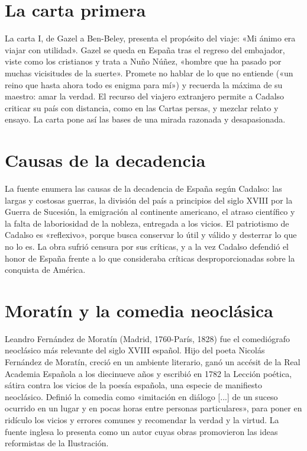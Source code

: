 \documentclass{book}
\begin{document}

\section{La carta primera}

La carta I, de Gazel a Ben-Beley, presenta el propósito del viaje: «Mi ánimo era viajar con utilidad». Gazel se queda en España tras el regreso del embajador, viste como los cristianos y trata a Nuño Núñez, «hombre que ha pasado por muchas vicisitudes de la suerte». Promete no hablar de lo que no entiende («un reino que hasta ahora todo es enigma para mí») y recuerda la máxima de su maestro: amar la verdad. El recurso del viajero extranjero permite a Cadalso criticar su país con distancia, como en las Cartas persas, y mezclar relato y ensayo. La carta pone así las bases de una mirada razonada y desapasionada.


\section{Causas de la decadencia}

La fuente enumera las causas de la decadencia de España según Cadalso: las largas y costosas guerras, la división del país a principios del siglo XVIII por la Guerra de Sucesión, la emigración al continente americano, el atraso científico y la falta de laboriosidad de la nobleza, entregada a los vicios. El patriotismo de Cadalso es «reflexivo», porque busca conservar lo útil y válido y desterrar lo que no lo es. La obra sufrió censura por sus críticas, y a la vez Cadalso defendió el honor de España frente a lo que consideraba críticas desproporcionadas sobre la conquista de América.


\section{Moratín y la comedia neoclásica}

Leandro Fernández de Moratín (Madrid, 1760-París, 1828) fue el comediógrafo neoclásico más relevante del siglo XVIII español. Hijo del poeta Nicolás Fernández de Moratín, creció en un ambiente literario, ganó un accésit de la Real Academia Española a los diecinueve años y escribió en 1782 la Lección poética, sátira contra los vicios de la poesía española, una especie de manifiesto neoclásico. Definió la comedia como «imitación en diálogo [...] de un suceso ocurrido en un lugar y en pocas horas entre personas particulares», para poner en ridículo los vicios y errores comunes y recomendar la verdad y la virtud. La fuente inglesa lo presenta como un autor cuyas obras promovieron las ideas reformistas de la Ilustración.
\end{document}
